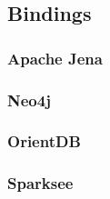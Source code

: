 \subsection{Bindings\label{subse:bindings}}

\subsubsection{Apache Jena\label{subse:apacheJenaDesign}}

\subsubsection{Neo4j\label{subse:neo4jDesign}}

\subsubsection{OrientDB\label{subse:orientdbDesign}}

\subsubsection{Sparksee\label{subse:sparkseeDesign}}
